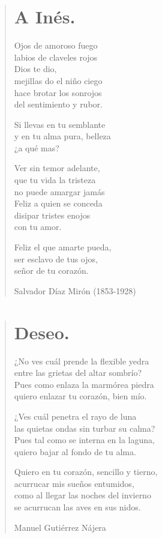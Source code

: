 \documentclass[12pt, twoside]{book}
\begin{document}
\newpage
\begin{verse}
\begin{center}
\section{A Inés.}
\end{center}
Ojos de amoroso fuego\\
labios de claveles rojos\\
Dios te dio,\\
mejillas do el niño ciego\\
hace brotar los sonrojos\\
del sentimiento y rubor.
\newline

Si llevas en tu semblante\\
y en tu alma pura, belleza\\
¿a qué mas?
\newline

Ver sin temor adelante,\\
que tu vida la tristeza\\
no puede amargar jamás\\
Feliz a quien se conceda\\
disipar tristes enojos\\
con tu amor.
\newline

Feliz el que amarte pueda,\\
ser esclavo de tus ojos,\\
señor de tu corazón.
\newline

Salvador Díaz Mirón (1853-1928)
\end{verse}

\newpage
\begin{verse}
\begin{center}
\section{Deseo.}
\end{center}
¿No ves cuál prende la flexible yedra\\
entre las grietas del altar sombrío?\\
Pues como enlaza la marmórea piedra\\
quiero enlazar tu corazón, bien mío.
\newline

¿Ves cuál penetra el rayo de luna\\
las quietas ondas sin turbar su calma?\\
Pues tal como se interna en la laguna,\\
quiero bajar al fondo de tu alma.
\newline

Quiero en tu corazón, sencillo y tierno,\\
acurrucar mis sueños entumidos,\\
como al llegar las noches del invierno\\
se acurrucan las aves en sus nidos.

Manuel Gutiérrez Nájera
\end{verse}
\end{document}
